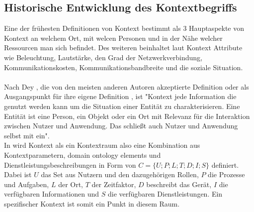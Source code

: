 \subsection{Historische Entwicklung des Kontextbegriffs}


Eine der frühesten Definitionen von Kontext \cite{schilit_context-aware_1994} bestimmt als 3 Hauptaspekte von Kontext an welchem Ort, mit welcen Personen und in der Nähe welcher Ressourcen man sich befindet.
Des weiteren beinhaltet laut \cite{schilit_context-aware_1994} Kontext Attribute wie Beleuchtung, Lautstärke, den Grad der Netzwerkverbindung, Kommunikationskosten, Kommunikationsbandbreite und die soziale Situation.\\\\
Nach Dey \cite{dey_understanding_2001}, die von den meisten anderen Autoren akzeptierte Definition \cite{wei_liu_survey_2011,alegre_engineering_2016,aguilar_cameonto_2018} oder als Ausgangspunkt für ihre eigene Definition \cite{kokinov_operational_2007,kayes_icaf_2012}, ist "Kontext jede Information die genutzt werden kann um die Situation einer Entität zu charakterisieren. Eine Entität ist eine Person, ein Objekt oder ein Ort mit Relevanz für die Interaktion zwischen Nutzer und Anwendung. Das schließt auch Nutzer und Anwendung selbst mit ein".\\
In \cite{wolfgang_kaltz_context-aware_2005} wird Kontext als ein Kontextraum also eine Kombination aus Kontextparametern, domain ontology elements und Dienstleistungsbeschreibungen in Form von $C = \{U;P;L;T;D;I;S\}$ definiert.\\ Dabei ist $U$ das Set aus Nutzern und den dazugehörigen Rollen, $P$ die Prozesse und Aufgaben, $L$ der Ort, $T$ der Zeitfaktor, $D$ beschreibt das Gerät, $I$ die verfügbaren Informationen und $S$ die verfügbaren Dienstleistungen. Ein spezifischer Kontext ist somit ein Punkt in diesem Raum. \\
